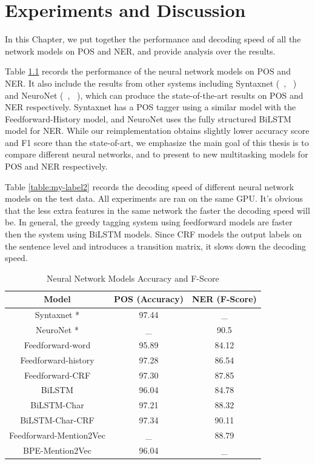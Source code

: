 \documentclass{sfuthesis}
\begin{document}
\chapter{Experiments and Discussion}

In this Chapter, we put together the performance and decoding speed of all the network models on POS and NER, and provide analysis over the results.

Table \ref{table:my-label1} records the performance of the neural network models on POS and NER. It also include the results from other systems including Syntaxnet (~\citeauthor{alberti2017syntaxnet}, ~\citeyear{alberti2017syntaxnet}) and NeuroNet (~\citeauthor{2017neuroner}, ~\citeyear{2017neuroner}), which can produce the state-of-the-art results on POS and NER respectively. Syntaxnet has a POS tagger using a similar model with the Feedforward-History model, and NeuroNet uses the fully structured BiLSTM model for NER. While our reimplementation obtains slightly lower accuracy score and F1 score than the state-of-art, we emphasize the main goal of this thesis is to compare different neural networks, and to present to new multitasking models for POS and NER respectively.

Table \ref{table:my-label2} records the decoding speed of different neural network models on the test data. All experiments are ran on the same GPU. It's obvious that the less extra features in the same network the faster the decoding speed will be. In general, the greedy tagging system using feedforward models are faster then the system using BiLSTM models. Since CRF models the output labels on the sentence level and introduces a transition matrix, it slows down the decoding speed.

\begin{table}[]
\centering
\caption{Neural Network Models Accuracy and F-Score}
\label{table:my-label1}
\begin{tabular}{|c|c|c|}
\hline
Model         & POS (Accuracy)  & NER (F-Score)       \\ \hline
Syntaxnet \**    & 97.44         &   _     \\ \hline
NeuroNet \**    & _    & 90.5                \\ \hline 
Feedforward-word    & 95.89          &   84.12     \\ \hline
Feedforward-history & 97.28     & 86.54        \\ \hline
Feedforward-CRF     & 97.30          &   87.85     \\ \hline
BiLSTM  & 96.04     & 84.78                             \\ \hline
BiLSTM-Char & 97.21 & 88.32             \\ \hline
BiLSTM-Char-CRF & 97.34  & 90.11             \\ \hline
Feedforward-Mention2Vec  & _    & 88.79                       \\ \hline
BPE-Mention2Vec & 96.04     &  _   \\ \hline   
\end{tabular}
\end{table}
\end{document}
